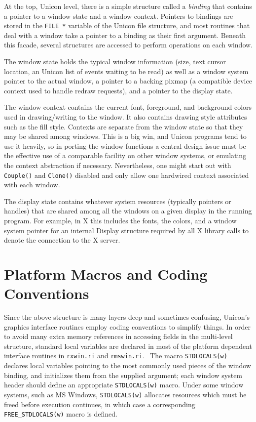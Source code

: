 



At the top, Unicon level, there is a simple structure called a
\textit{binding} that contains a pointer to a window state and a
window context. Pointers to bindings are stored in the \texttt{FILE *}
variable of the Unicon file structure, and most routines that deal
with a window take a pointer to a binding as their first
argument. Beneath this facade, several structures are accessed to
perform operations on each window.

The window state holds the typical window information (size, text
cursor location, an Unicon list of events waiting to be read) as well
as a window system pointer to the actual window, a pointer to a
backing pixmap (a {\textquotedbl}compatible device
context{\textquotedbl} used to handle redraw requests), and a pointer
to the display state.

The window context contains the current font, foreground, and
background colors used in drawing/writing to the window.  It also
contains drawing style attributes such as the fill style. Contexts are
separate from the window state so that they may be shared among
windows. This is a big win, and Unicon programs tend to use it
heavily, so in porting the window functions a central design issue
must be the effective use of a comparable facility on other window
systems, or emulating the context abstraction if
necessary. Nevertheless, one might start out with \texttt{Couple()}
and \texttt{Clone()} disabled and only allow one hardwired context
associated with each window.

The display state contains whatever system resources (typically
pointers or handles) that are shared among all the windows on a given
display in the running program. For example, in X this includes the
fonts, the colors, and a window system pointer for an internal Display
structure required by all X library calls to denote the connection to
the X server.


\section{Platform Macros and Coding Conventions}

Since the above structure is many layers deep and sometimes confusing,
Unicon's graphics interface routines employ coding conventions to
simplify things. In order to avoid many extra memory references in
accessing fields in the multi-level structure,
{\textquotedbl}standard{\textquotedbl} local variables are declared in
most of the platform dependent interface routines in \texttt{rxwin.ri}
and \texttt{rmswin.ri}. \ The macro \texttt{STDLOCALS(w)} declares
local variables pointing to the most commonly used pieces of the
window binding, and initializes them from the supplied argument; each
window system header should define an appropriate
\texttt{STDLOCALS(w)} macro. Under some window systems, such as MS
Windows, \texttt{STDLOCALS(w)} allocates resources which must be freed
before execution continues, in which case a corresponding
\texttt{FREE\_STDLOCALS(w)} macro is defined.

